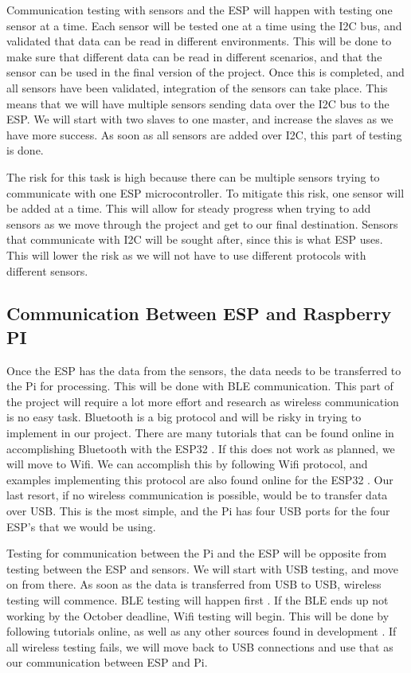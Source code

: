 \documentclass[letterpaper, 10 pt, conference]{ieeeconf}  %
\begin{document}
Communication testing with sensors and the ESP will happen with testing one sensor at a time. Each sensor will be tested one at a time using the I2C bus, and validated that data can be read in different environments. This will be done to make sure that different data can be read in different scenarios, and that the sensor can be used in the final version of the project. Once this is completed, and all sensors have been validated, integration of the sensors can take place. This means that we will have multiple sensors sending data over the I2C bus to the ESP. We will start with two slaves to one master, and increase the slaves as we have more success. As soon as all sensors are added over I2C, this part of testing is done. 

The risk for this task is high because there can be multiple sensors trying to communicate with one ESP microcontroller. To mitigate this risk, one sensor will be added at a time. This will allow for steady progress when trying to add sensors as we move through the project and get to our final destination. Sensors that communicate with I2C will be sought after, since this is what ESP uses. This will lower the risk as we will not have to use different protocols with different sensors.

\subsection{Communication Between ESP and Raspberry PI}
Once the ESP has the data from the sensors, the data needs to be transferred to the Pi for processing. This will be done with BLE communication. This part of the project will require a lot more effort and research as wireless communication is no easy task. Bluetooth is a big protocol and will be risky in trying to implement in our project. There are many tutorials that can be found online in accomplishing Bluetooth with the ESP32 \cite{micropy}. If this does not work as planned, we will move to Wifi. We can accomplish this by following Wifi protocol, and examples implementing this protocol are also found online for the ESP32 \cite{rasServer}. Our last resort, if no wireless communication is possible, would be to transfer data over USB. This is the most simple, and the Pi has four USB ports for the four ESP's that we would be using.

Testing for communication between the Pi and the ESP will be opposite from testing between the ESP and sensors. We will start with USB testing, and move on from there. As soon as the data is transferred from USB to USB, wireless testing will commence. BLE testing will happen first \cite{micropy}. If the BLE ends up not working by the October deadline, Wifi testing will begin. This will be done by following tutorials online, as well as any other sources found in development \cite{rasServer} . If all wireless testing fails, we will move back to USB connections and use that as our communication between ESP and Pi. 
\end{document}
